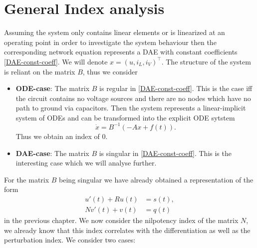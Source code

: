 \section{General Index analysis}

Assuming the system only contains linear elements or is linearized at an operating point in order to investigate the system behaviour then the corresponding network equation represents a DAE with constant coefficients \ref{DAE-const-coeff}. We will denote $x=(u, i_L, i_V)^\top$. The structure of the system is reliant on the matrix $B$, thus we consider

\begin{itemize}
	\item \textbf{ODE-case}: \newline
	The matrix $B$ is regular in \ref{DAE-const-coeff}. This is the case iff the circuit contains no voltage sources and there are no nodes which have no path to ground via capacitors. Then the system represents a linear-implicit system of ODEs and can be transformed into the explicit ODE sytstem
	\begin{displaymath}
		\dot{x}=B^{-1}(-Ax+f(t)).
	\end{displaymath}
	Thus we obtain an index of $0$.
		
	\item \textbf{DAE-case}:
	The matrix $B$ is singular in \ref{DAE-const-coeff}. This is the interesting case which we will analyse further.
\end{itemize}

For the matrix $B$ being singular we have already obtained a representation of the form
\begin{align*}
	u'(t) + Ru(t) &= s(t), \\
	Nv'(t) + v(t) &= q(t)
\end{align*}
in the previous chapter. We now consider the nilpotency index of the matrix $N$, we already know that this index correlates with the differentiation as well as the perturbation index. We consider two cases:

